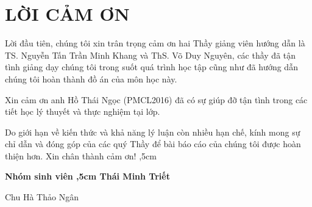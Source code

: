 \documentclass[12pt,a4paper,oneside]{book}
\begin{document}
\newpage

\newpage
\def\@chapter[#1]#2{\ifnum \c@secnumdepth >\m@ne
                       \if@mainmatter
                         \refstepcounter{chapter}%
                         \typeout{\@chapapp\space\thechapter.}%
                         \addcontentsline{toc}{chapter}%
                              {\bf  Chương \protect\numberline{\thechapter. } #1}%
                       \else
                         \addcontentsline{toc}{chapter}{ #1}%
                       \fi
                    \else
                      \addcontentsline{toc}{chapter}{ #1}%
                    \fi
                    \chaptermark{#1}%
                    \addtocontents{lof}{\protect\addvspace{10\p@}}%
                    \addtocontents{lot}{\protect\addvspace{10\p@}}%
                    \if@twocolumn
                      \@topnewpage[\@makechapterhead{#2}]%
                    \else
                      \@makechapterhead{#2}%
                      \@afterheading
                    \fi}
\tableofcontents
{}

\makeatletter
{}%
\makeatother

\renewcommand*{\listfigurename}{DANH MỤC HÌNH ẢNH}
\listoffigures
\thispagestyle{empty}

\renewcommand*{\listtablename}{DANH MỤC BẢNG BIỂU}
\listoftables
\thispagestyle{empty}

\pagestyle{plain}
\chapter*{LỜI CẢM ƠN}
	Lời đầu tiên, chúng tôi xin trân trọng cảm ơn hai Thầy giảng viên hướng dẫn là TS. Nguyễn Tấn Trần Minh Khang và ThS. Võ Duy Nguyên, các thầy đã tận tình giảng dạy chúng tôi trong suốt quá trình học tập cũng như đã hướng dẫn chúng tôi hoàn thành đồ án của môn học này.
	
	Xin cảm ơn anh Hồ Thái Ngọc (PMCL2016) đã có sự giúp đỡ tận tình trong các tiết học lý thuyết và thực nghiệm tại lớp.
	
	Do giới hạn về kiến thức và khả năng lý luận còn nhiều hạn chế, kính mong sự chỉ dẫn và đóng góp của các quý Thầy để bài báo cáo của chúng tôi được hoàn thiện hơn. Xin chân thành cảm ơn!
	,5cm
	\hskip 9cm {\bf Nhóm sinh viên
	,5cm
	\hskip 9cm Thái Minh Triết
	
	\hskip 8.5cm Chu Hà Thảo Ngân
	}
\end{document}

